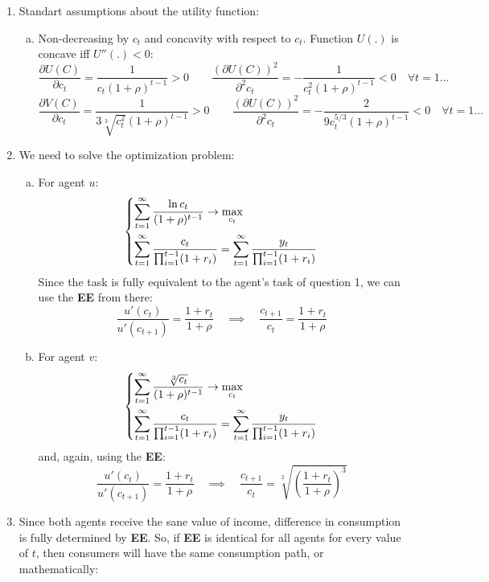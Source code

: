 \documentclass[11pt, oneside]{article}
\renewcommand{\r}{\rho}
\begin{document}
\begin{enumerate}[(1)]
	\item 	Standart assumptions about the utility function:
	\begin{enumerate}[(a)]
		\item 	Non-decreasing by $ c_{t} $ and concavity with respect to $ c_{t} $. Function $ U(.) $ is concave iff $ U''(.) < 0 $:
		\[
		\frac{\partial U(C)}{\partial c_{t}} =  \frac{1}{c_{t}(1+\r)^{t-1}} > 0 \quad\quad \frac{(\partial U(C))^{2}}{\partial^{2} c_{t}} = -\frac{1}{c_{t}^{2}(1+\r)^{t-1}} < 0 \quad \forall t = 1 \dots
		\]
		\[
		\frac{\partial V(C)}{\partial c_{t}} =  \frac{1}{3\sqrt[3]{c_{t}^{2}}(1+\r)^{t-1}} > 0 \quad\quad \frac{(\partial U(C))^{2}}{\partial^{2} c_{t}} = -\frac{2}{9c_{t}^{5/3}(1+\r)^{t-1}} < 0 \quad \forall t = 1 \dots
		\]
	\end{enumerate}
	\item We need to solve the optimization problem:
	\begin{enumerate}[(a)]
		\item For agent $ u $:
		\[
		\begin{dcases}
		\sum_{t=1}^{\infty} \frac{\ln c_{t}}{(1+\r)^{t-1}} \to \max_{c_{t}} \\
			\sum_{t=1}^{\infty}  \frac{c_{t}}{\prod_{i=1}^{t-1} (1+r_{i})} = 	\sum_{t=1}^{\infty}  \frac{y_{t}}{\prod_{i=1}^{t-1} (1+r_{i})}
	\end{dcases}
		\]
		Since the task is fully equivalent to the agent's task of question 1, we can use the \textbf{EE} from there:
		\[
		\frac{u'(c_{t})}{u'(c_{t+1})} = \frac{1+r_{t}}{1+\r} \quad\implies\quad \frac{c_{t+1}}{c_{t}} = \frac{1+r_{t}}{1 + \r}
		\]
		\item For agent $ v $:
				\[
		\begin{dcases}
			\sum_{t=1}^{\infty} \frac{\sqrt[3]{c_{t}}}{(1+\r)^{t-1}} \to \max_{c_{t}} \\
			\sum_{t=1}^{\infty}  \frac{c_{t}}{\prod_{i=1}^{t-1} (1+r_{i})} = 	\sum_{t=1}^{\infty}  \frac{y_{t}}{\prod_{i=1}^{t-1} (1+r_{i})}
		\end{dcases}
		\]
		and, again, using the \textbf{EE}:
		\[
		\frac{u'(c_{t})}{u'(c_{t+1})} = \frac{1+r_{t}}{1+\r} \quad\implies\quad \frac{c_{t+1}}{c_{t}} = \sqrt[2]{\left(\frac{1+r_{t}}{1 + \r}\right)^{3}}
		\]
	\end{enumerate}
	\item Since both agents receive the sane value of income, difference in consumption is fully determined by \textbf{EE}. So, if \textbf{EE} is identical for all agents for every value of $ t $, then consumers will have the same consumption path, or mathematically:

\end{enumerate}
\end{document}
